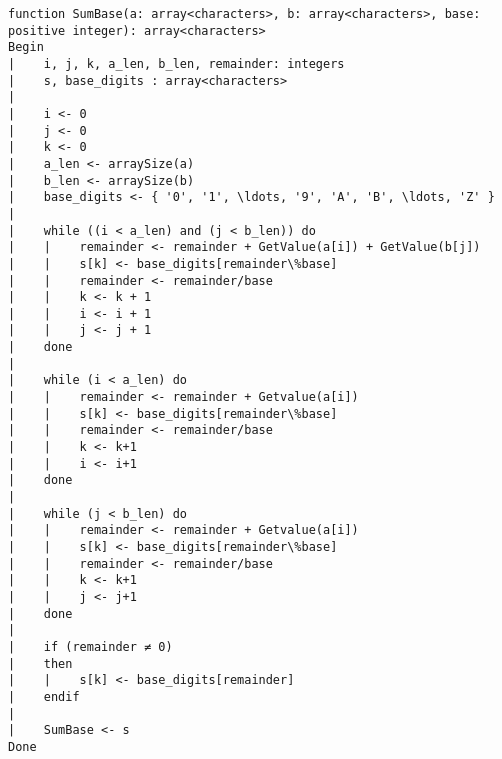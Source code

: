 \begin{lstlisting}[breaklines]
function SumBase(a: array<characters>, b: array<characters>, base: positive integer): array<characters>
Begin
|    i, j, k, a_len, b_len, remainder: integers
|    s, base_digits : array<characters>
|
|    i <- 0
|    j <- 0
|    k <- 0
|    a_len <- arraySize(a)
|    b_len <- arraySize(b)
|    base_digits <- { '0', '1', \ldots, '9', 'A', 'B', \ldots, 'Z' }
|
|    while ((i < a_len) and (j < b_len)) do
|    |    remainder <- remainder + GetValue(a[i]) + GetValue(b[j])
|    |    s[k] <- base_digits[remainder\%base]
|    |    remainder <- remainder/base
|    |    k <- k + 1
|    |    i <- i + 1
|    |    j <- j + 1
|    done
|
|    while (i < a_len) do
|    |    remainder <- remainder + Getvalue(a[i])
|    |    s[k] <- base_digits[remainder\%base]
|    |    remainder <- remainder/base
|    |    k <- k+1
|    |    i <- i+1
|    done
|    
|    while (j < b_len) do
|    |    remainder <- remainder + Getvalue(a[i])
|    |    s[k] <- base_digits[remainder\%base]
|    |    remainder <- remainder/base
|    |    k <- k+1
|    |    j <- j+1
|    done
|
|    if (remainder ≠ 0)
|    then
|    |    s[k] <- base_digits[remainder]
|    endif
|
|    SumBase <- s
Done
\end{lstlisting}
